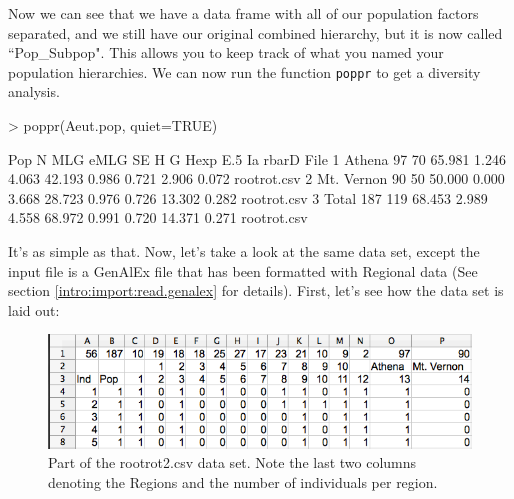 \documentclass[letterpaper]{article}
\begin{document}
Now we can see that we have a data frame with all of our population factors separated, and we still have our original combined hierarchy, but it is now called ``Pop\_Subpop". This allows you to keep track of what you named your population hierarchies. We can now run the function \texttt{poppr} to get a diversity analysis.
\begin{Schunk}
\begin{Sinput}
> poppr(Aeut.pop, quiet=TRUE)
\end{Sinput}
\begin{Soutput}
         Pop   N MLG   eMLG    SE     H      G  Hexp   E.5     Ia rbarD        File
1     Athena  97  70 65.981 1.246 4.063 42.193 0.986 0.721  2.906 0.072 rootrot.csv
2 Mt. Vernon  90  50 50.000 0.000 3.668 28.723 0.976 0.726 13.302 0.282 rootrot.csv
3      Total 187 119 68.453 2.989 4.558 68.972 0.991 0.720 14.371 0.271 rootrot.csv
\end{Soutput}
\end{Schunk}
It's as simple as that. Now, let's take a look at the same data set, except the input file is a GenAlEx file that has been formatted with Regional data (See section \ref{intro:import:read.genalex} for details). First, let's see how the data set is laid out:


\begin{figure}[h!]
  \centering
  \caption{\footnotesize \footnotesize Part of the rootrot2.csv data set. Note the last two columns denoting the Regions and the number of individuals per region.}
  \label{rootrot2_csv}
\includegraphics{rootrot2}
\end{figure}

\begin{center}
\end{center}
\end{document}
